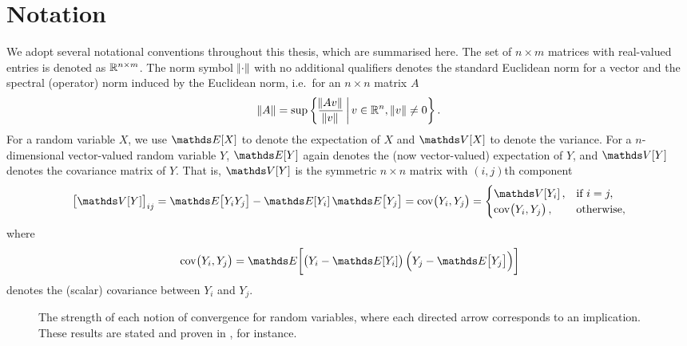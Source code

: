 \section{Notation}
We adopt several notational conventions throughout this thesis, which are summarised here.
The set of \(n \times m\) matrices with real-valued entries is denoted as \(\mathbb{R}^{n\times m}\).
The norm symbol \(\norm{\cdot}\) with no additional qualifiers denotes the standard Euclidean norm for a vector and the spectral (operator) norm induced by the Euclidean norm, i.e.\ for an \(n \times n\) matrix \(A\)
\[
	\norm{A} = \sup\left\{\frac{\norm{Av}}{\norm{v}}\,\middle|\,v \in \mathbb{R}^n, \, \norm{v} \neq 0\right\}.
\]
For a random variable \(X\), we use \(\avg{X}\) to denote the expectation of \(X\) and \(\var{X}\) to denote the variance.
For a \(n\)-dimensional vector-valued random variable \(Y\), \(\avg{Y}\) again denotes the (now vector-valued) expectation of \(Y\), and \(\var{Y}\) denotes the covariance matrix of \(Y\).
That is, \(\var{Y}\) is the symmetric \(n\times n\) matrix with \((i,j)\)th component
\[
	\left[\var{Y}\right]_{ij} = \avg{Y_iY_j} - \avg{Y_i}\avg{Y_j} = \cov{Y_i, Y_j} = \begin{cases}
		\var{Y_i},      & \text{if } i = j, \\
		\cov{Y_i, Y_j}, & \text{otherwise},
	\end{cases}
\]
where
\[
	\cov{Y_i, Y_j} = \avg{\left(Y_i - \avg{Y_i}\right)\left(Y_j - \avg{Y_j}\right)}
\]
denotes the (scalar) covariance between \(Y_i\) and \(Y_j\).

\begin{figure}
	\begin{center}
		\caption{The strength of each notion of convergence for random variables, where each directed arrow corresponds to an implication.
			These results are stated and proven in \citet{Bremaud_2020_ProbabilityTheoryStochastic}, for instance.}
		\label{fig:rv_conv_impl}
	\end{center}
\end{figure}

